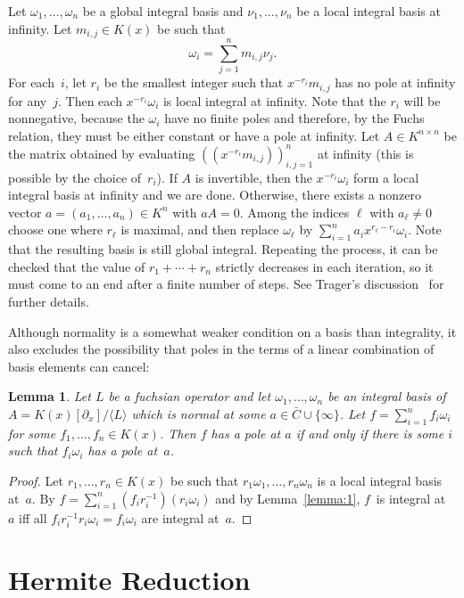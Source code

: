 \documentclass{sig-alternate}
\newtheorem{lemma}[theorem]{Lemma}
\def\<#1>{\langle#1\rangle}
\begin{document}
Let $\omega_1,\dots,\omega_n$ be a global integral basis and $\nu_1,\dots,\nu_n$ be a local
integral basis at infinity. Let $m_{i,j}\in K(x)$ be such that
\[
 \omega_i = \sum_{j=1}^n m_{i,j}\nu_j.
\]
For each~$i$, let $r_i$ be the smallest integer such that $x^{-r_i}m_{i,j}$ has no pole at infinity for any~$j$.
Then each $x^{-r_i}\omega_i$ is local integral at infinity.
Note that the $r_i$ will be nonnegative, because the $\omega_i$ have no finite poles and therefore,
by the Fuchs relation, they must be either constant or have a pole at infinity.
Let $A\in K^{n\times n}$ be the matrix obtained by evaluating $((x^{-r_i}m_{i,j}))_{i,j=1}^n$ at infinity
(this is possible by the choice of~$r_i$).
If $A$ is invertible, then the $x^{-r_i}\omega_i$ form a local integral basis at infinity and we are done.
Otherwise, there exists a nonzero vector $a=(a_1,\dots,a_n)\in K^n$ with $aA=0$.
Among the indices $\ell$ with $a_\ell\neq0$ choose one where $r_\ell$ is maximal, %
and then replace $\omega_\ell$ by $\sum_{i=1}^n a_i x^{r_\ell-r_i}\omega_i$.
Note that the resulting basis is still global integral.
Repeating the process, it can be checked that the value of $r_1+\cdots+r_n$ strictly decreases in each iteration,
so it must come to an end after a finite number of steps.
See Trager's discussion~\cite{trager84} for further details.

Although normality is a somewhat weaker condition on a basis than integrality,
it also excludes the possibility that poles in the terms of a linear combination
of basis elements can cancel:

\begin{lemma}\label{lemma:3}
  Let $L$ be a fuchsian operator and let $\omega_1,\dots,\omega_n$ be an integral basis of $A=K(x)[\partial_x]/\<L>$
  which is normal at some $a\in\bar C\cup\{\infty\}$.
  Let $f=\sum_{i=1}^n f_i\omega_i$ for some $f_1,\dots,f_n\in K(x)$.
  Then $f$ has a pole at $a$ if and only if
  there is some $i$ such that $f_i\omega_i$ has a pole at~$a$.
\end{lemma}
\begin{proof}
  Let $r_1,\dots,r_n\in K(x)$ be such that $r_1\omega_1,\dots,r_n\omega_n$ is a
  local integral basis at~$a$. By $f=\sum_{i=1}^n
  (f_ir_i^{-1})(r_i\omega_i)$ and by Lemma~\ref{lemma:1}, $f$~is integral at~$a$ iff all
  $f_ir_i^{-1}r_i\omega_i=f_i\omega_i$ are integral at~$a$.
\end{proof}

\section{Hermite Reduction}\label{sec:hermite}
\end{document}

